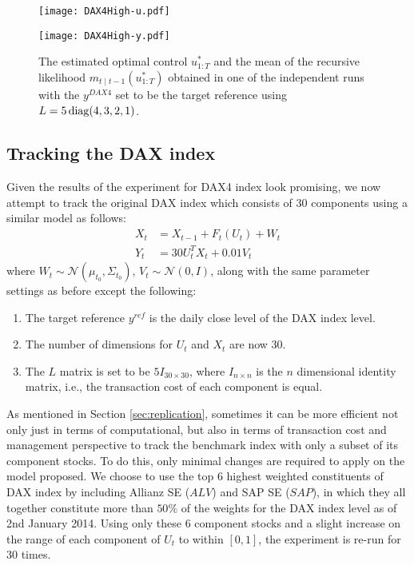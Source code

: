 \begin{figure}[htbp]
\centering
    \begin{minipage}{0.5\textwidth}
        \centering
        \texttt{[image: DAX4High-u.pdf]}
    \end{minipage}%
    \begin{minipage}{0.5\textwidth}
        \centering
        \texttt{[image: DAX4High-y.pdf]}
    \end{minipage}
\caption{The estimated optimal control $u^*_{1:T}$ and the mean of the recursive likelihood $m_{t \mid t-1}(u^*_{1:T})$ obtained in one of the independent runs with the $y^{DAX4}$ set to be the target reference using $L = 5\operatorname{diag}(4,3,2,1)$.}
\label{fig:dax42}
\end{figure}

\subsection{Tracking the DAX index}
Given the results of the experiment for DAX4 index look promising, we now attempt to track the original DAX index which consists of $30$ components using a similar model as follows:
\begin{align}
  X_t &= X_{t-1} + F_t(U_t) + W_t \\
  Y_t &= 30U^T_tX_t + 0.01V_t
\end{align}
where $W_t \sim \mathcal{N}(\mu_{t_0}, \Sigma_{t_0})$, $V_t \sim \mathcal{N}(0, I)$, along with the same parameter settings as before except the following:
\begin{enumerate}
\item The target reference $y^{ref}$ is the daily close level of the DAX index level.
\item The number of dimensions for $U_t$ and $X_t$ are now $30$.
\item The $L$ matrix is set to be $5I_{30 \times 30}$, where $I_{n \times n}$ is the $n$ dimensional identity matrix, i.e., the transaction cost of each component is equal.
\end{enumerate}

As mentioned in Section \ref{sec:replication}, sometimes it can be more efficient not only just in terms of computational, but also in terms of transaction cost and management perspective to track the benchmark index with only a subset of its component stocks. To do this, only minimal changes are required to apply on the model proposed. We choose to use the top $6$ highest weighted constituents of DAX index by including Allianz SE ($ALV$) and SAP SE ($SAP$), in which they all together constitute more than $50\%$ of the weights for the DAX index level as of 2nd January 2014. Using only these $6$ component stocks and a slight increase on the range of each component of $U_t$ to within $[0,1]$, the experiment is re-run for $30$ times.

